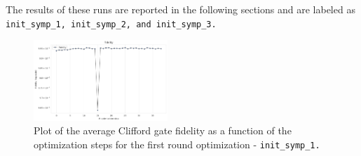 The results of these runs are reported in the following sections and are labeled as \tt{init\_symp\_1}, \tt{init\_symp\_2}, and \tt{init\_symp\_3}.

\begin{figure}[h!]
    \centering
    \includegraphics[width=0.45\textwidth]{figures/png/RB_optimization/NM/InitialSymplex/20241110_211211/fidelity.png}
    \caption{Plot of the average Clifford gate fidelity as a function of the optimization steps for the first round optimization - \tt{init\_symp\_1}.}
    \label{fig:20241110_211211:fidelity}
\end{figure}

